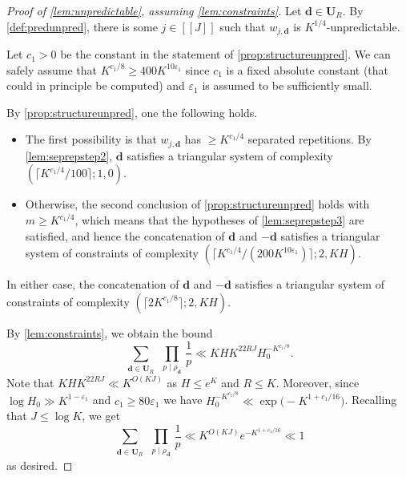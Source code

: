 \documentclass[11pt]{amsart}
\theoremstyle{definition}
\renewcommand{\leq}{\leqslant}
\renewcommand{\geq}{\geqslant}
\newcommand{\sinterval}[1]{[\![#1]\!] }
\newcommand{\eps}{\varepsilon}
\renewcommand{\d}{\boldsymbol{d}}
\newcommand{\cstH}{\eps_1}
\newcommand{\cstm}{10\eps_1}
\newcommand{\unpred}{\mathbf{U}_{\!\tupsize}}
\newcommand{\fprod}[1]{\rho_{#1}}
\newcommand{\pall}{\fprod{\d}}
\newcommand{\repR}{J}
\newcommand{\repK}{K}
\newcommand{\newR}{\sinterval{J}}
\newcommand{\tupsize}{R}
\begin{document}
\begin{proof}[Proof of \cref{lem:unpredictable}, assuming \cref{lem:constraints}]
Let $\d\in \unpred$. By \cref{def:predunpred}, there is some ${j\in \newR}$ such that $w_{j,\d}$ is $\repK^{1/4}$-unpredictable. 

Let $c_1>0$ be the constant in the statement of \cref{prop:structureunpred}. We can safely assume that ${\repK^{c_1/8} \geq 400\repK^{\cstm}}$ since $c_1$ is a fixed absolute constant (that could in principle be computed) and $\cstH$ is assumed to be sufficiently small.

By \cref{prop:structureunpred}, one the following holds.
\begin{itemize}
	\item The first possibility is that $w_{j,\d}$ has $\geq \repK^{c_1/4}$ separated repetitions. By \cref{lem:seprepstep2}, $\d$ satisfies a triangular system of complexity $(\lceil \repK^{c_1/4}/100 \rceil ;1,0)$.
	\item Otherwise, the second conclusion of \cref{prop:structureunpred} holds with $m\geq \repK^{c_1/4}$, which means that the hypotheses of \cref{lem:seprepstep3} are satisfied, and hence the concatenation of $\d$ and $-\d$ satisfies a triangular system of constraints of complexity $(\lceil \repK^{c_1/4}/(200\repK^{\cstm})\rceil ;2,\repK H)$.
\end{itemize}
In either case, the concatenation of $\d$ and $-\d$ satisfies a triangular system of constraints of complexity $(\lceil 2\repK^{c_1/8} \rceil ;2,\repK H)$.

By \cref{lem:constraints}, we obtain the bound
\begin{equation*}
	\sum_{\substack{\d\in \unpred}}\,\prod_{p\mid \pall}\, \frac{1}{p} \ll \repK H \repK^{22\tupsize \repR} H_0^{-\repK^{c_1/8}}.
\end{equation*}
Note that $\repK H \repK^{22\tupsize \repR} \ll \repK^{O(\repK \repR)}$ as $H\leq e^{\repK}$ and $\tupsize\leq \repK$. Moreover, since ${\log H_0 \gg\repK^{1-\cstH}}$ and $c_1\geq 80\cstH$ we have $H_0^{-\repK^{c_1/8}} \ll \exp\big(-\repK^{1+c_1/16}\big)$. Recalling that $\repR \leq \log \repK$, we get
\begin{equation*}
	\sum_{\substack{\d\in \unpred}}\,\prod_{p\mid \pall}\, \frac{1}{p} \ll \repK^{O(\repK \repR)} e^{-\repK^{1+c_1/16}} \ll 1
\end{equation*}
as desired.
\end{proof}
\end{document}
